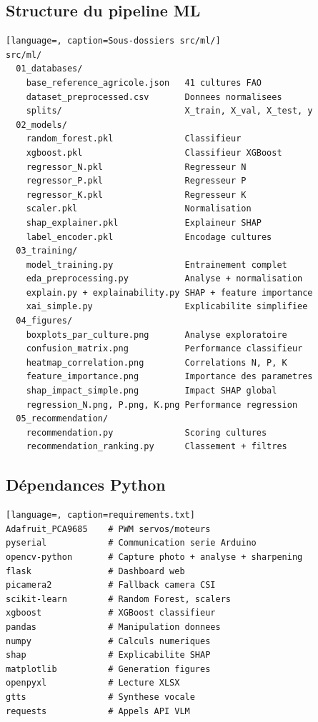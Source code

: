 \documentclass[a4paper,12pt,openany,titlepage]{scrartcl}
\begin{document}
\subsection{Structure du pipeline ML}
\begin{lstlisting}[language=, caption=Sous-dossiers src/ml/]
src/ml/
  01_databases/
    base_reference_agricole.json   41 cultures FAO
    dataset_preprocessed.csv       Donnees normalisees
    splits/                        X_train, X_val, X_test, y
  02_models/
    random_forest.pkl              Classifieur
    xgboost.pkl                    Classifieur XGBoost
    regressor_N.pkl                Regresseur N
    regressor_P.pkl                Regresseur P
    regressor_K.pkl                Regresseur K
    scaler.pkl                     Normalisation
    shap_explainer.pkl             Explaineur SHAP
    label_encoder.pkl              Encodage cultures
  03_training/
    model_training.py              Entrainement complet
    eda_preprocessing.py           Analyse + normalisation
    explain.py + explainability.py SHAP + feature importance
    xai_simple.py                  Explicabilite simplifiee
  04_figures/
    boxplots_par_culture.png       Analyse exploratoire
    confusion_matrix.png           Performance classifieur
    heatmap_correlation.png        Correlations N, P, K
    feature_importance.png         Importance des parametres
    shap_impact_simple.png         Impact SHAP global
    regression_N.png, P.png, K.png Performance regression
  05_recommendation/
    recommendation.py              Scoring cultures
    recommendation_ranking.py      Classement + filtres
\end{lstlisting}

\subsection{Dépendances Python}
\begin{lstlisting}[language=, caption=requirements.txt]
Adafruit_PCA9685    # PWM servos/moteurs
pyserial            # Communication serie Arduino
opencv-python       # Capture photo + analyse + sharpening
flask               # Dashboard web
picamera2           # Fallback camera CSI
scikit-learn        # Random Forest, scalers
xgboost             # XGBoost classifieur
pandas              # Manipulation donnees
numpy               # Calculs numeriques
shap                # Explicabilite SHAP
matplotlib          # Generation figures
openpyxl            # Lecture XLSX
gtts                # Synthese vocale
requests            # Appels API VLM
\end{lstlisting}
\end{document}

